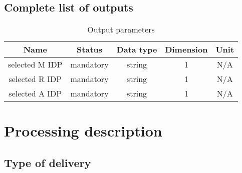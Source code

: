 \documentclass[a4paper, oneside, 11pt, article, english]{memoir}
\begin{document}
\section{Complete list of outputs}
\label{sec:output}

\iffalse
{
  \itshape
  A comprehensive list of outputs must be provided in the table. For each output,
  the following information is needed

  \begin{description}
    \firmlist
  \item[Name] the name must follow the nomenclature as defined by WP120 Data
    Products Definition Document [RD3].
  \item[Status] specify if this data is \emph{mandatory} or \emph{optional} to run the algorithm.
  \item[Data type] see \cref{sec:nomenclature} for the standard definitions
  \item[Dimension] specify the dimension of the data (e.g; the dimension of a scalar is 0, of an array 1, etc).
  \item[Unit] provide the unit of the data and the data-system of units (cgs or mks).
  \end{description}
}
\fi

\begin{table}[htbp]
  \centering
  \caption{Output parameters}
  \label{tab:output}
  \begin{tabular}{ccccc}
    \toprule
    Name & Status & Data type & Dimension & Unit \\
    \midrule
    selected M IDP & mandatory & string & 1 & N/A \\
    selected R IDP & mandatory & string & 1 & N/A \\
    selected A IDP & mandatory & string & 1 & N/A \\
    \bottomrule
  \end{tabular}
\end{table}


\clearpage
\chapter{Processing description}
\label{chap:processing}

\section{Type of delivery}
\label{sec:delivery}
\end{document}
